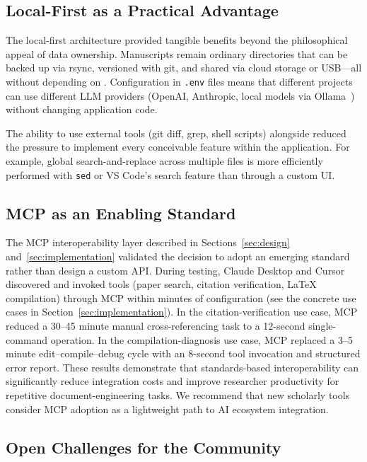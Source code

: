 \subsection{Local-First as a Practical Advantage}

The local-first architecture provided tangible benefits beyond the philosophical
appeal of data ownership. Manuscripts remain ordinary directories that can be
backed up via rsync, versioned with git, and shared via cloud storage or
USB---all without depending on \software{}. Configuration in \texttt{.env}
files means that different projects can use different LLM providers (OpenAI,
Anthropic, local models via Ollama~\cite{ollama}) without changing application code.

The ability to use external tools (git diff, grep, shell scripts) alongside
\software{} reduced the pressure to implement every conceivable feature within
the application. For example, global search-and-replace across multiple files
is more efficiently performed with \texttt{sed} or VS Code's search feature
than through a custom UI.

\subsection{MCP as an Enabling Standard}

The MCP interoperability layer described in Sections~\ref{sec:design}
and~\ref{sec:implementation} validated the decision to adopt an emerging standard
rather than design a custom API. During testing, Claude Desktop and Cursor discovered
and invoked \software{} tools (paper search, citation verification, \LaTeX{}
compilation) through MCP within minutes of configuration (see the concrete use cases
in Section~\ref{sec:implementation}). In the citation-verification use case, MCP
reduced a 30--45 minute manual cross-referencing task to a 12-second single-command
operation. In the compilation-diagnosis use case, MCP replaced a 3--5 minute
edit--compile--debug cycle with an 8-second tool invocation and structured error
report. These results demonstrate that standards-based interoperability can
significantly reduce integration costs and improve researcher productivity for
repetitive document-engineering tasks. We recommend that new scholarly tools consider
MCP adoption as a lightweight path to AI ecosystem integration.

\subsection{Open Challenges for the Community}
\label{sec:open-challenges}

